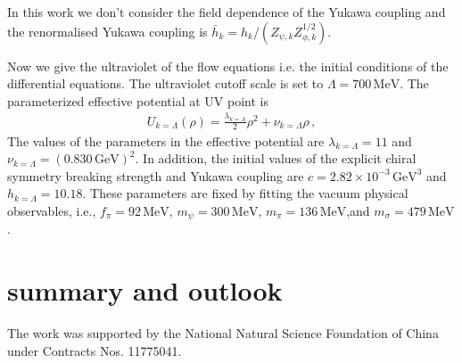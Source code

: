 \documentclass[%
reprint,
superscriptaddress,
showpacs,preprintnumbers,
 amsmath,amssymb,
 aps,
prd,
]{revtex4-1}
\begin{document}
In this work we don't consider the field dependence of the Yukawa coupling and the renormalised Yukawa coupling is $\bar{h}_k=h_k/(Z_{\psi,k}Z^{1/2}_{\phi,k})$.\par
Now we give the ultraviolet of the flow equations i.e. the initial conditions of the differential equations. The ultraviolet cutoff scale is set to $\Lambda=700\,\mathrm{MeV}$. The parameterized effective potential at UV point is
\begin{align}
U_{k=\Lambda}(\rho)=\frac{\lambda_{k=\Lambda}}{2}\rho^2+\nu_{k=\Lambda}\rho\,,
\end{align}
The values of the parameters in the effective potential are $\lambda_{k=\Lambda}=11$ and $\nu_{k=\Lambda}=(0.830\,\mathrm{GeV})^2$. In addition, the initial values of the explicit chiral symmetry breaking strength and Yukawa coupling are $c=2.82\times 10^{-3}\,\mathrm{GeV}^3$ and $h_{k=\Lambda}=10.18$. These parameters are fixed by fitting the vacuum physical observables, i.e., $f_\pi=92\,\mathrm{MeV}$, $m_\psi=300\,\mathrm{MeV}$, $m_\pi=136\,\mathrm{MeV}$,and $m_\sigma=479\,\mathrm{MeV}$.  

\section{summary and outlook}
\label{sec:SO}

\begin{acknowledgments}

The work was supported by the National Natural Science Foundation of China under Contracts Nos. 11775041.

\end{acknowledgments}

\appendix
\end{document}
